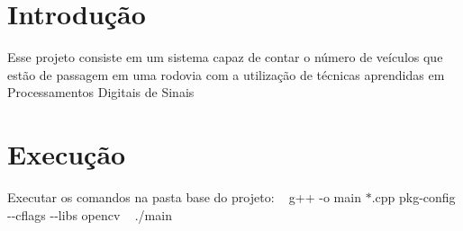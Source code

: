 \hypertarget{index_intro_sec}{}\section{Introdução}\label{index_intro_sec}
Esse projeto consiste em um sistema capaz de contar o número de veículos que estão de passagem em uma rodovia com a utilização de técnicas aprendidas em Processamentos Digitais de Sinais\hypertarget{index_install_sec}{}\section{Execução}\label{index_install_sec}
Executar os comandos na pasta base do projeto\+: ~\newline
 g++ -\/o main $\ast$.cpp {\ttfamily pkg-\/config -\/-\/cflags -\/-\/libs opencv} ~\newline
 ./main 